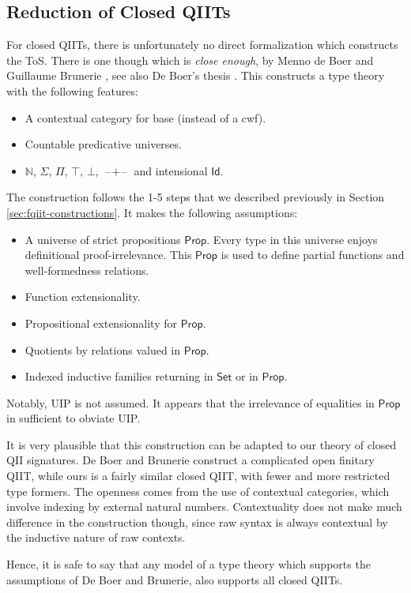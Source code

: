 \documentclass[12pt,a4paper,twoside,openany]{book}
\theoremstyle{remark}
\theoremstyle{definition}
\theoremstyle{theorem}
\newcommand{\ms}[1]{\mathsf{#1}}
\newcommand{\Id}{\mathsf{Id}}
\newcommand{\blank}{\mathord{\hspace{1pt}\text{--}\hspace{1pt}}}
\newcommand{\Set}{\mathsf{Set}}
\begin{document}
\subsection{Reduction of Closed QIITs}

For closed QIITs, there is unfortunately no direct formalization which
constructs the ToS. There is one though which is \emph{close enough}, by Menno
de Boer and Guillaume Brunerie \cite{initiality-agda}, see also De Boer's thesis
\cite{deboer-initiality}. This constructs a type theory with the following
features:
\begin{itemize}
  \item A contextual category for base (instead of a cwf).
  \item Countable predicative universes.
  \item $\mathbb{N}$, $\Sigma$, $\Pi$, $\top$, $\bot$, $\blank\!+\!\blank$ and
        intensional $\Id$.
\end{itemize}
The construction follows the 1-5 steps that we described previously in Section \ref{sec:fqiit-constructions}. It makes the following assumptions:
\begin{itemize}
\item A universe of strict propositions $\ms{Prop}$. Every type in this universe
      enjoys definitional proof-irrelevance. This $\ms{Prop}$ is used to define
      partial functions and well-formedness relations.
\item Function extensionality.
\item Propositional extensionality for $\ms{Prop}$.
\item Quotients by relations valued in $\ms{Prop}$.
\item Indexed inductive families returning in $\Set$ or in $\ms{Prop}$.
\end{itemize}
Notably, UIP is not assumed. It appears that the irrelevance of equalities in
$\ms{Prop}$ in sufficient to obviate UIP.

It is very plausible that this construction can be adapted to our theory of
closed QII signatures. De Boer and Brunerie construct a complicated open
finitary QIIT, while ours is a fairly similar closed QIIT, with fewer and more
restricted type formers. The openness comes from the use of contextual
categories, which involve indexing by external natural numbers. Contextuality
does not make much difference in the construction though, since raw syntax is
always contextual by the inductive nature of raw contexts.

Hence, it is safe to say that any model of a type theory which supports the
assumptions of De Boer and Brunerie, also supports all closed QIITs.
\end{document}
